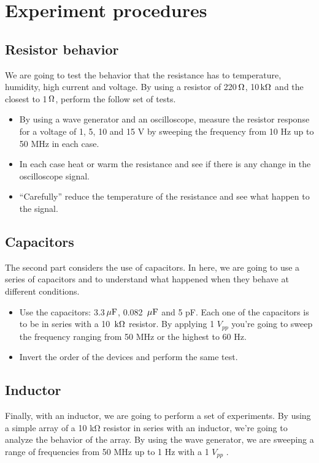 \documentclass{article}
\newcommand{\unit}[1]{{\rm\,#1}}
\begin{document}
\section{Experiment procedures}

\subsection{Resistor behavior}
We are going to test the behavior that the resistance has to temperature, humidity, high current and voltage. By using a resistor of 220$\unit{\Omega}$, 10$\unit{k\Omega}$ and the closest to 1$\unit{\Omega}$, perform the follow set of tests.
\begin{itemize}
	\item  
	By using a wave generator and an oscilloscope, measure the resistor response for
a voltage of 1, 5, 10 and 15 V by sweeping the frequency from 10 Hz up to 50
MHz in each case.
	\item  
	In each case heat or warm the resistance and see if there is any change in the
oscilloscope signal.
	\item
	``Carefully'' reduce the temperature of the resistance and see what happen to the
signal.
\end{itemize}

\subsection{Capacitors}
The second part considers the use of capacitors. In here, we are going to use a series of
capacitors and to understand what happened when they behave at different conditions.

\begin{itemize}
	\item
	Use the capacitors: 3.3$\unit{\mu F}$, 0.082 $\unit{\mu F}$ and 5 pF. Each one of the capacitors is to be in series with a 10 $\unit{k\Omega}$ resistor. By applying 1 $V_{pp}$ you’re going to sweep the frequency ranging from 50 MHz or the highest to 60 Hz.
	\item
	Invert the order of the devices and perform the same test.
\end{itemize}

\subsection{Inductor}
Finally, with an inductor, we are going to perform a set of experiments. By using
a simple array of a 10 kΩ resistor in series with an inductor, we’re going to analyze
the behavior of the array. By using the wave generator, we are sweeping a range of
frequencies from 50 MHz up to 1 Hz with a 1 $V_{pp}$ .
\end{document}

